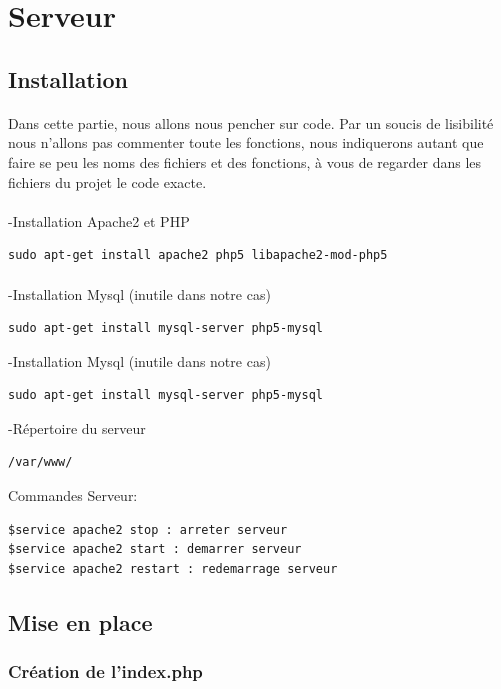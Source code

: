 \documentclass[a4paper, titlepage, oneside, 12pt]{article}%
\begin{document}
\section{Serveur}
\subsection{Installation}
\paragraph{}
Dans cette partie, nous allons nous pencher sur code. Par un soucis de lisibilité nous n'allons pas commenter toute les fonctions, nous indiquerons autant que faire se peu les noms des fichiers et des fonctions, à vous de regarder dans les fichiers du projet le code exacte.
\paragraph{}
-Installation Apache2 et PHP
\begin{lstlisting}
sudo apt-get install apache2 php5 libapache2-mod-php5
\end{lstlisting}
\paragraph{}
-Installation Mysql (inutile dans notre cas)
\begin{lstlisting}
sudo apt-get install mysql-server php5-mysql
\end{lstlisting}
-Installation Mysql (inutile dans notre cas)
\begin{lstlisting}
sudo apt-get install mysql-server php5-mysql
\end{lstlisting}
-Répertoire du serveur
\begin{lstlisting}
/var/www/
\end{lstlisting}

Commandes Serveur:
\begin{lstlisting}
$service apache2 stop : arreter serveur
$service apache2 start : demarrer serveur
$service apache2 restart : redemarrage serveur
\end{lstlisting}

\subsection{Mise en place}
\subsubsection{Création de l'index.php}
\end{document}
